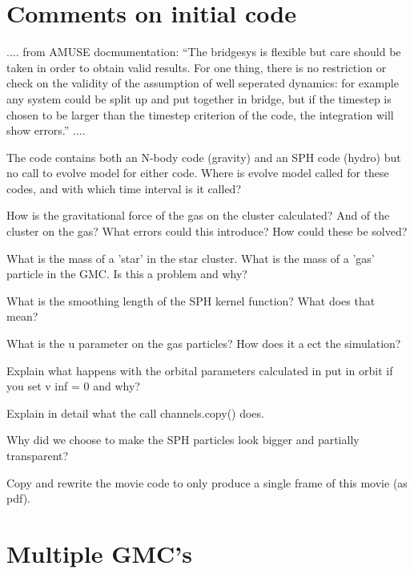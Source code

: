 \documentclass{aa}
\begin{document}

\section{Comments on initial code}


.... from AMUSE docmumentation: ``The bridgesys is flexible but care should be taken in order to obtain valid results. For one thing, there is no restriction or check on the validity of the assumption of well seperated dynamics: for example any system could be split up and put together in bridge, but if the timestep is chosen to be larger than the timestep criterion of the code, the integration will show errors.'' ....

The code contains both an N-body code (gravity) and an SPH code (hydro) but no call to evolve model
for either code. Where is evolve model called for these codes, and with which time interval is it called?

How is the gravitational force of the gas on the cluster calculated? And of the cluster on the gas?
What errors could this introduce? How could these be solved?

What is the mass of a 'star' in the star cluster. What is the mass of a 'gas' particle in the GMC. Is
this a problem and why?

What is the smoothing length of the SPH kernel function? What does that mean?

What is the u parameter on the gas particles? How does it aect the simulation?

Explain what happens with the orbital parameters calculated in put in orbit if you set v inf = 0 and
why?

Explain in detail what the call channels.copy() does.

Why did we choose to make the SPH particles look bigger and partially transparent?

Copy and rewrite the movie code to only produce a single frame of this movie (as pdf).

\section{Multiple GMC's}
\end{document}
